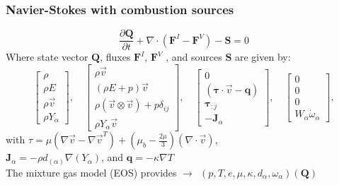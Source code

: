 \begin{frame}\frametitle{Navier-Stokes with combustion sources}
  \begin{center}
  \begin{equation*}
    \frac{\partial\mathbf{Q}}{\partial{t}} + \nabla \cdot (\mathbf{F}^I - \mathbf{F}^V) - \mathbf{S} = 0
  \end{equation*}
    Where state vector $\mathbf{Q}$, fluxes $\mathbf{F}^I$, $\mathbf{F}^V$ , and sources $\mathbf{S}$ are given by:
 \begin{equation*}
      \begin{bmatrix}
        \rho\\\rho{E}\\\rho\vec{v}\\\rho{Y}_\alpha\end{bmatrix},\quad
      \begin{bmatrix} \rho\vec{v}\\(\rho{E} +
        p)\vec{v}\\\rho(\vec{v} \otimes \vec{v}) +
        p\delta_{ij}\\\rho{Y}_\alpha\vec{v}\end{bmatrix}, \quad
       \begin{bmatrix} 0\\(\mathbf{\tau} \cdot \vec{v} - \mathbf{q})\\\mathbf{\tau}_{:j}\\-\mathbf{J}_\alpha\end{bmatrix},\quad
       \begin{bmatrix} 0\\0\\0\\W_\alpha\dot{\omega}_\alpha\end{bmatrix},
 \end{equation*}
with $\tau = \mu\left(\nabla\vec{v} - \nabla\vec{v}^T\right) + \left(\mu_b - \frac{2\mu}{3}\right)\left(\nabla \cdot \vec{v}\right)$,\\
\vspace{5pt}
$\mathbf{J}_\alpha = -\rho d_{(\alpha)} \nabla(Y_\alpha)$, and $\mathbf{q} = -\kappa\nabla{T}$\\
\vspace{10pt}
    The mixture gas model (EOS) provides $\rightarrow~~(p,T,e,\mu,\kappa,d_{\alpha}, \omega_\alpha)(\mathbf{Q})$
  \end{center}
\end{frame}


